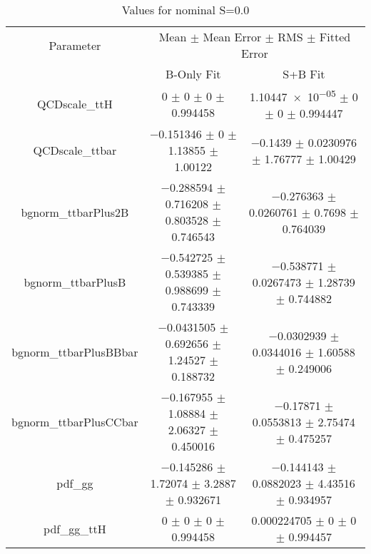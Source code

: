 \begin{table}
\centering
\caption{Values for nominal S=0.0}
\begin{tabular}{ccc}
\toprule
Parameter & \multicolumn{2}{c}{Mean $\pm$ Mean Error $\pm$ RMS $\pm$ Fitted Error}\\
 & B-Only Fit & S+B Fit\\
\midrule
QCDscale\_ttH & \num{0} $\pm$ \num{0} $\pm$ \num{0} $\pm$ \num{0.994458} & \num{1.10447e-05} $\pm$ \num{0} $\pm$ \num{0} $\pm$ \num{0.994447}\\
QCDscale\_ttbar & \num{-0.151346} $\pm$ \num{0} $\pm$ \num{1.13855} $\pm$ \num{1.00122} & \num{-0.1439} $\pm$ \num{0.0230976} $\pm$ \num{1.76777} $\pm$ \num{1.00429}\\
bgnorm\_ttbarPlus2B & \num{-0.288594} $\pm$ \num{0.716208} $\pm$ \num{0.803528} $\pm$ \num{0.746543} & \num{-0.276363} $\pm$ \num{0.0260761} $\pm$ \num{0.7698} $\pm$ \num{0.764039}\\
bgnorm\_ttbarPlusB & \num{-0.542725} $\pm$ \num{0.539385} $\pm$ \num{0.988699} $\pm$ \num{0.743339} & \num{-0.538771} $\pm$ \num{0.0267473} $\pm$ \num{1.28739} $\pm$ \num{0.744882}\\
bgnorm\_ttbarPlusBBbar & \num{-0.0431505} $\pm$ \num{0.692656} $\pm$ \num{1.24527} $\pm$ \num{0.188732} & \num{-0.0302939} $\pm$ \num{0.0344016} $\pm$ \num{1.60588} $\pm$ \num{0.249006}\\
bgnorm\_ttbarPlusCCbar & \num{-0.167955} $\pm$ \num{1.08884} $\pm$ \num{2.06327} $\pm$ \num{0.450016} & \num{-0.17871} $\pm$ \num{0.0553813} $\pm$ \num{2.75474} $\pm$ \num{0.475257}\\
pdf\_gg & \num{-0.145286} $\pm$ \num{1.72074} $\pm$ \num{3.2887} $\pm$ \num{0.932671} & \num{-0.144143} $\pm$ \num{0.0882023} $\pm$ \num{4.43516} $\pm$ \num{0.934957}\\
pdf\_gg\_ttH & \num{0} $\pm$ \num{0} $\pm$ \num{0} $\pm$ \num{0.994458} & \num{0.000224705} $\pm$ \num{0} $\pm$ \num{0} $\pm$ \num{0.994457}\\
\bottomrule
\end{tabular}
\end{table}